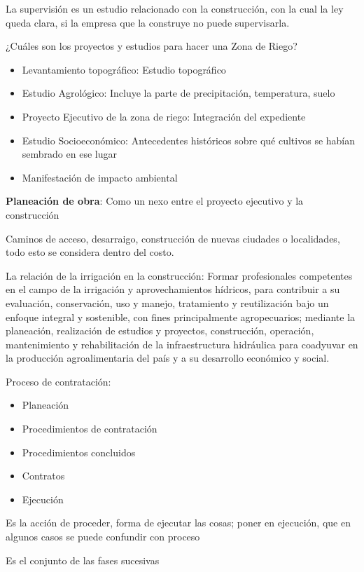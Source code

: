 La supervisión es un estudio relacionado con la construcción, con la cual la ley queda clara, si la empresa que la construye no puede supervisarla.

¿Cuáles son los proyectos y estudios para hacer una Zona de Riego?
\begin{itemize}
    \item Levantamiento topográfico: Estudio topográfico
    \item Estudio Agrológico: Incluye la parte de precipitación, temperatura, suelo
    \item Proyecto Ejecutivo de la zona de riego: Integración del expediente
    \item Estudio Socioeconómico: Antecedentes históricos sobre qué cultivos se habían sembrado en ese lugar
    \item Manifestación de impacto ambiental
\end{itemize}
\textbf{Planeación de obra}: Como un nexo entre el proyecto ejecutivo y la construcción

Caminos de acceso, desarraigo, construcción de nuevas ciudades o localidades, todo esto se considera dentro del costo.

La relación de la irrigación en la construcción: Formar profesionales competentes en el campo de la irrigación y aprovechamientos hídricos, para contribuir a su evaluación, conservación, uso y manejo, tratamiento y reutilización bajo un enfoque integral y sostenible, con fines principalmente agropecuarios; mediante la planeación, realización de estudios y proyectos, construcción, operación, mantenimiento y rehabilitación de la infraestructura hidráulica para coadyuvar en la producción agroalimentaria del país y a su desarrollo económico y social.

Proceso de contratación:
\begin{itemize}
    \item Planeación
    \item Procedimientos de contratación
    \item Procedimientos concluidos
    \item Contratos
    \item Ejecución
\end{itemize}
\begin{definition}[Procedimiento]
    Es la acción de proceder, forma de ejecutar las cosas; poner en ejecución, que en algunos casos se puede confundir con proceso
\end{definition}
\begin{definition}[Proceso]
    Es el conjunto de las fases sucesivas
\end{definition}

